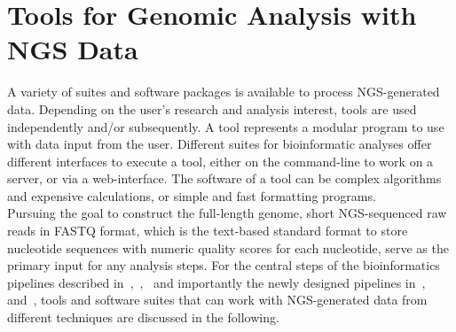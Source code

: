 \section{Tools for Genomic Analysis with NGS Data}
A variety of suites and software packages is available to process \ac{NGS}-generated data. Depending on the user's research and analysis interest, tools are used independently and/or subsequently. A tool represents a modular program to use with data input from the user. Different suites for bioinformatic analyses offer different interfaces to execute a tool, either on the command-line to work on a server, or via a web-interface. The software of a tool can be complex algorithms and expensive calculations, or simple and fast formatting programs. \\
Pursuing the goal to construct the full-length genome, short \ac{NGS}-sequenced raw reads in FASTQ format, which is the text-based standard format to store nucleotide sequences with numeric quality scores for each nucleotide, serve as the primary input for any analysis steps. For the central steps of the bioinformatics pipelines described in~,~,~ and importantly the newly designed pipelines in~,~ and~, tools and software suites that can work with \ac{NGS}-generated data from different techniques are discussed in the following. 

